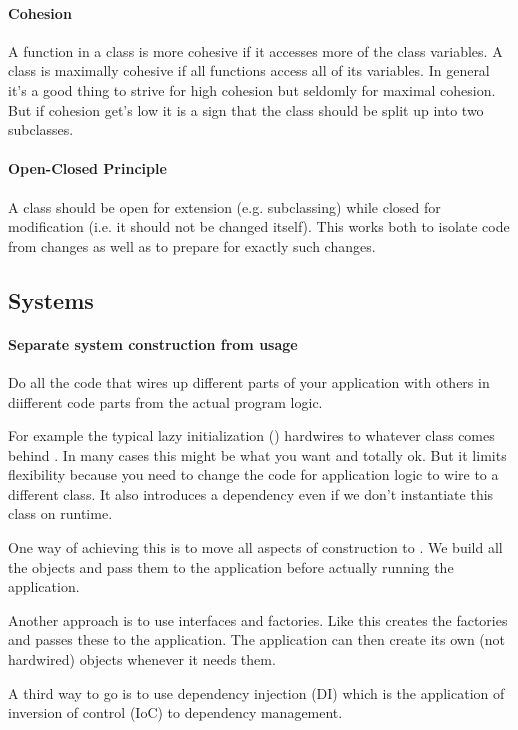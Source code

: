 \documentclass[a4paper, twocolumn]{article}
\newcommand{\code}[1]{\texttt{\color{black}{#1}}}
\begin{document}
\paragraph{Cohesion} A function in a class is more cohesive if it accesses more of the class variables. A class is maximally cohesive if all functions access all of its variables. In general it's a good thing to strive for high cohesion but seldomly for maximal cohesion. But if cohesion get's low it is a sign that the class should be split up into two subclasses.

\paragraph{Open-Closed Principle}
A class should be open for extension (e.g. subclassing) while closed for modification (i.e. it should not be changed itself). This works both to isolate code from changes as well as to prepare for exactly such changes.

\subsection{Systems}
\paragraph{Separate system construction from usage} Do all the code that wires up different parts of your application with others in diifferent code parts from the actual program logic.

For example the typical lazy initialization (\code{if (singleton == null) singleton = new ...}) hardwires \code{singleton} to whatever class comes behind \code{new}. In many cases this might be what you want and totally ok. But it limits flexibility because you need to change the code for application logic to wire \code{singleton} to a different class. It also introduces a dependency even if we don't instantiate this class on runtime.

One way of achieving this is to move all aspects of construction to \code{main}. We build all the objects and pass them to the application before actually running the application.

Another approach is to use interfaces and factories. Like this \code{main} creates the factories and passes these to the application. The application can then create its own (not hardwired) objects whenever it needs them.

A third way to go is to use dependency injection (DI) which is the application of inversion of control (IoC) to dependency management.
\end{document}
